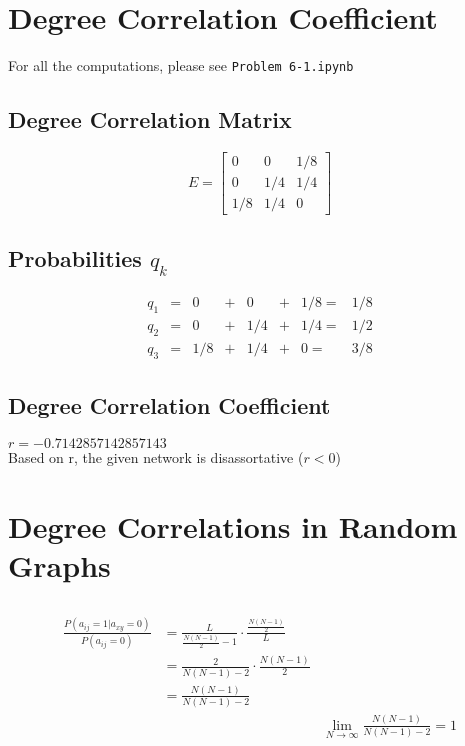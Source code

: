 \documentclass {article}
\begin{document}
\section{Degree Correlation Coefficient}
For all the computations, please see \texttt{Problem 6-1.ipynb}
\subsection{Degree Correlation Matrix}
\[
 	E = 
 	\begin{bmatrix}
 	0     &  0   & 1/8 \\
 	0     & 1/4 & 1/4 \\
  	1/8  & 1/4 & 0
 	\end{bmatrix}
\]

\subsection{Probabilities $q_k$}
\[{
\begin{array}{cccccccc}
q_1 &=& 0&+&0&+&1/8 =&1/8 \\
q_2 &=& 0&+&1/4&+&1/4 =&1/2 \\
q_3 &=& 1/8&+&1/4&+&0 =&3/8 
\end{array}
}\]
\subsection{Degree Correlation Coefficient}
$r = -0.7142857142857143$\\

Based on r, the given network is disassortative ($r < 0$)
\newpage



\section{Degree Correlations in Random Graphs}
\subsection{}

\subsection{}

\subsection{}
\begin{align*}
	\frac{P \left( a_{ij} = 1 | a_{xy} = 0 \right)}{P \left( a_{ij}=0 \right)} &=\frac{L}{\frac{N(N-1)}{2}-1} \cdot \frac{\frac{N(N-1)}{2}}{L}\\
	&= \frac{2}{N(N-1)-2} \cdot \frac{N(N-1)}{2}\\
	&= \frac{N(N-1)}{N(N-1)-2}\\
	&&\lim\limits_{N \to \infty} \frac{N(N-1)}{N(N-1)-2} = 1
\end{align*}
\end{document}
